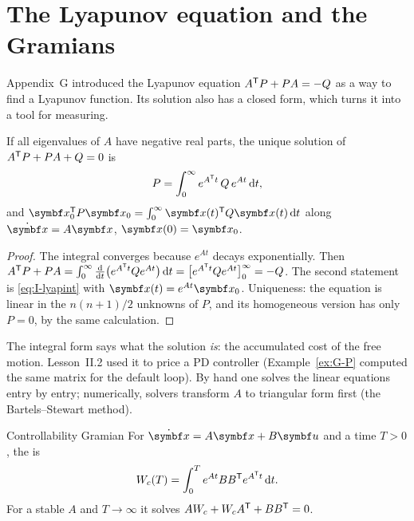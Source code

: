 \section{The Lyapunov equation and the Gramians}

Appendix~G introduced the Lyapunov equation $A^{\mathsf{T}} P + PA = -Q$ as a way to find a Lyapunov function. Its solution also has a closed form, which turns it into a tool for measuring.

\begin{theorem}
\label{thm:I-lyapint}
If all eigenvalues of $A$ have negative real parts, the unique solution of $A^{\mathsf{T}} P + PA + Q = 0$ is
\begin{equation}\label{eq:I-lyapint}
  P = \int_0^\infty e^{A^{\mathsf{T}} t}\,Q\,e^{At}\,\mathrm{d} t ,
\end{equation}
and $\vx_0^\T P\vx_0 = \int_0^\infty \vx(t)^\T Q\vx(t)\,\dd t$ along $\dot{\vx} = A\vx$, $\vx(0) = \vx_0$.
\end{theorem}
\begin{proof}
The integral converges because $e^{At}$ decays exponentially. Then $A^{\mathsf{T}} P + PA = \int_0^\infty \frac{\mathrm{d}}{\mathrm{d} t}\big(e^{A^{\mathsf{T}} t}Qe^{At}\big)\,\mathrm{d} t = \big[e^{A^{\mathsf{T}} t}Qe^{At}\big]_0^\infty = -Q$. The second statement is \cref{eq:I-lyapint} with $\vx(t) = e^{At}\vx_0$. Uniqueness: the equation is linear in the $n(n+1)/2$ unknowns of $P$, and its homogeneous version has only $P = 0$, by the same calculation.
\end{proof}

The integral form says what the solution \emph{is}: the accumulated cost of the free motion. Lesson~II.2 used it to price a PD controller (Example~\ref{ex:G-P} computed the same matrix for the default loop). By hand one solves the linear equations entry by entry; numerically, solvers transform $A$ to triangular form first (the Bartels–Stewart method).

\begin{definition}{Controllability Gramian}
For $\dot{\vx} = A\vx + B\symbf u$ and a time $T > 0$, the  is
\begin{equation}\label{eq:I-gram}
  W_c(T) = \int_0^T e^{At}BB^{\mathsf{T}} e^{A^{\mathsf{T}} t}\,\mathrm{d} t .
\end{equation}
For a stable $A$ and $T \to \infty$ it solves $AW_c + W_cA^{\mathsf{T}} + BB^{\mathsf{T}} = 0$.
\end{definition}

